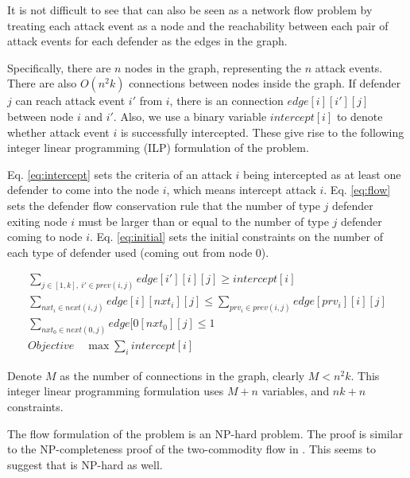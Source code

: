 It is not difficult to see that \prob can also be seen as a network flow problem by treating each attack event as a node and the reachability between each pair of attack events for each defender as the edges in the graph. 

Specifically, there are $n$ nodes in the graph, representing the $n$ attack events. 
There are also $O(n^2k)$ connections between nodes inside the graph.
If defender $j$ can reach attack event $i'$ from $i$, there is an connection 
$edge[i][i'][j]$ between node $i$ and $i'$. 
Also, we use a binary variable $intercept[i]$ to denote whether attack event $i$ is successfully intercepted. 
These give rise to the following integer linear programming (ILP) formulation of the problem.

Eq. \eqref{eq:intercept} sets the criteria of an attack $i$ being intercepted as at least one defender to come into the node $i$, which means intercept attack $i$.
Eq. \eqref{eq:flow} sets the defender flow conservation rule that the number of type $j$ defender exiting node $i$ must be larger than or equal to the number of type $j$ defender coming to node $i$.
Eq. \eqref{eq:initial} sets the initial constraints on the number of each type of defender used (coming out from node 0).

\begin{gather}
\sum_{j\in[1, k],\ i'\in prev(i, j)} edge[i'][i][j] \geq intercept[i] \label{eq:intercept}\\
\sum_{nxt_i\in next(i, j)} edge[i][nxt_i][j] \leq \sum_{prv_i \in prev(i,j)} edge[prv_i][i][j]  \label{eq:flow} \\
\sum_{nxt_0 \in next(0, j)} edge[0[nxt_0][j] \leq 1 \label{eq:initial}  \\
Objective\quad \max \sum_i intercept[i]
\end{gather}

Denote $M$ as the number of connections in the graph, clearly $M<n^2k$.
This integer linear programming formulation uses $M + n$ variables, and 
$nk + n$ constraints. 

\begin{remark}
The flow formulation of the problem is an NP-hard problem. The proof is similar to the NP-completeness proof of the two-commodity flow in \cite{even1975complexity}. This seems to suggest that \prob is NP-hard as well. 
\end{remark}

